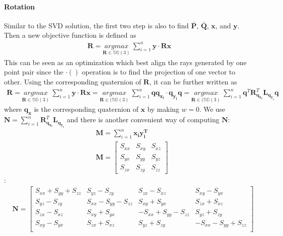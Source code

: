 \documentclass[a4paper]{report}
\begin{document}
\paragraph{Rotation}
Similar to the SVD solution, the first two step is also to find $\bar{\mathbf{P}}$, $\bar{\mathbf{Q}}$, $\mathbf{x}$, and $\mathbf{y}$. Then a new objective function is defined as
\begin{align*}
\mathbf{R}=\underset{\mathbf{R}\in \mathbb{SO}(3)}{argmax}\ \sum_{i=1}^{n} \mathbf{y} \cdot \mathbf{Rx}
\end{align*}
This can be seen as an optimization which best align the rays generated by one point pair since the $\cdot()$ operation is to find the projection of one vector to other. Using the corresponding quaternion of $\mathbf{R}$, it can be further written as
\begin{align*}
\mathbf{R}=\underset{\mathbf{R}\in \mathbb{SO}(3)}{argmax}\ \sum_{i=1}^{n} \mathbf{y} \cdot \mathbf{Rx}=\underset{\mathbf{R}\in (\mathbb{SO}(3)}{argmax}\ \sum_{i=1}^{n} \mathbf{qq_{x_i}} \cdot \mathbf{q_{y_i}q} = \underset{\mathbf{R}\in (\mathbb{SO}(3)}{argmax}\  \sum_{i=1}^{n} \mathbf{q}^T\mathbf{R}_{\mathbf{q_{x_i}}}^T\mathbf{L}_{\mathbf{q_{y_i}}}\mathbf{q}
\end{align*}
where $\mathbf{q_x}$ is the corresponding quaternion of $\mathbf{x}$ by making $w=0$. 
We use $\mathbf{N}=\sum_{i=1}^{n}\mathbf{R}_{\mathbf{q_{x_i}}}^T\mathbf{L}_{\mathbf{q_{y_i}}}$ and there is another convenient way of computing $\mathbf{N}$:
\begin{align*}
	&\mathbf{M}=\sum_{i=1}^{n} \mathbf{x_iy_i^T} \\
	&\mathbf{M}=\left[
	\begin{matrix}
	S_{xx} & S_{xy} & S_{xz} \\
	S_{yx} & S_{yy} & S_{yz} \\
	S_{zx} & S_{zy} & S_{zz} 
	\end{matrix}
	\right] 
	\end{align*}
	: 
	\begin{align*}
	&\mathbf{N}=\left[
	\begin{matrix}
	S_{xx}+S_{yy}+S_{zz} & S_{yz}-S_{zy} & S_{zx}-S_{xz} & S_{xy}-S_{yx} \\
	S_{yz}-S_{zy} & S_{xx}-S_{yy}-S_{zz} & S_{xy}+S_{yx} & S_{zx}+S_{xz} \\
	S_{zx}-S_{xz} &  S_{xy}+S_{yx} & -S_{xx}+S_{yy}-S_{zz}& S_{yz}+S_{zy} \\
	S_{xy}-S_{yx} & S_{zx}+S_{xz} & S_{yz}+S_{zy} & -S_{xx}-S_{yy}+S_{zz} \\
	\end{matrix}
	\right] 
\end{align*}
\end{document}
